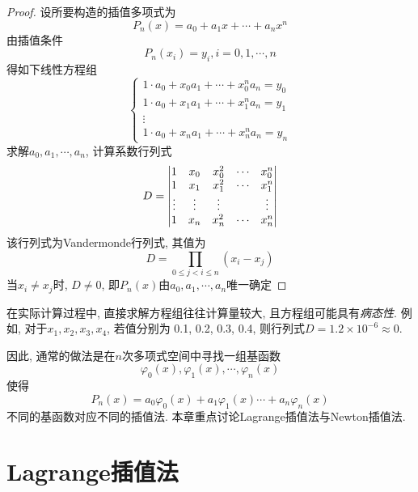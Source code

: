 \begin{proof}
    设所要构造的插值多项式为
    \begin{equation*}
        P_n(x)=a_0+a_1x+\cdots+a_nx^n
    \end{equation*}
    由插值条件
    \begin{equation*}
        P_n(x_i) = y_i, i=0,1,\cdots,n
    \end{equation*}
    得如下线性方程组
    \begin{equation*}
        \begin{cases}
            1\cdot a_0+x_0a_1+\cdots+x_0^na_n=y_0\\
            1\cdot a_0+x_1a_1+\cdots+x_1^na_n=y_1\\
            \vdots\\
            1\cdot a_0+x_na_1+\cdots+x_n^na_n=y_n
        \end{cases}
    \end{equation*}
    求解$a_0, a_1, \cdots, a_n$, 计算系数行列式
    \begin{equation*}
        D = \mqty|1&x_0&x_0^2&\cdots&x_0^n\\
        1&x_1&x_1^2&\cdots&x_1^n\\
        \vdots&\vdots&\vdots&&\vdots\\
        1&x_n&x_n^2&\cdots&x_n^n|
    \end{equation*}
    该行列式为Vandermonde行列式, 其值为
    \begin{equation*}
        D = \prod_{0\le j<i\le n}(x_i-x_j)
    \end{equation*}
    当$x_i\ne x_j$时, $D\ne 0$, 即$P_n(x)$由$a_0, a_1, \cdots, a_n$唯一确定
\end{proof}

在实际计算过程中, 直接求解方程组往往计算量较大, 且方程组可能具有\emph{病态性}. 例如, 对于$x_1,x_2,x_3,x_4$, 若值分别为
0.1, 0.2, 0.3, 0.4, 则行列式$D = 1.2\times10^{-6}\approx0$.

因此, 通常的做法是在$n$次多项式空间中寻找一组基函数
\begin{equation*}
    \varphi_0(x),\varphi_1(x),\cdots,\varphi_n(x)
\end{equation*}
使得
\begin{equation*}
    P_n(x)=a_0\varphi_0(x)+a_1\varphi_1(x)\cdots+a_n\varphi_n(x)
\end{equation*}
不同的基函数对应不同的插值法. 本章重点讨论Lagrange插值法与Newton插值法.

\section{Lagrange插值法}

